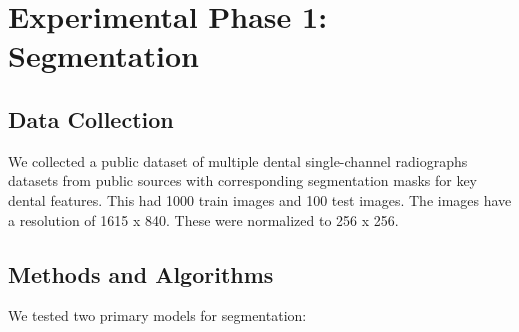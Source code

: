 \documentclass[12pt]{article}
\begin{document}
\section{Experimental Phase 1: Segmentation}
\subsection{Data Collection}
We collected a public dataset of multiple dental single-channel radiographs datasets from public sources with corresponding segmentation masks for key dental features. This had 1000 train images and 100 test images. The images have a resolution of 1615 x 840. These were normalized to 256 x 256.

\subsection{Methods and Algorithms}
We tested two primary models for segmentation:
\end{document}
